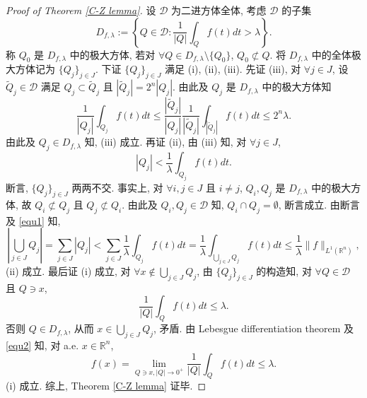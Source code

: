 \documentclass[a4paper,11pt]{article}
\theoremstyle{definition}
\begin{document}
\begin{CJK*}{UTF8}{gbsn}
\begin{proof}[Proof of Theorem \ref{C-Z lemma}]
    设 $ \mathcal{D} $ 为二进方体全体, 考虑 $ \mathcal{D} $ 的子集
    $$
        D_{f, \lambda} := \left\{ Q \in \mathcal{D} : \frac{1}{|Q|} \int_{Q} f(t) dt > \lambda \right\}.
    $$
    称 $ Q_0 $ 是 $ D_{f, \lambda} $ 中的极大方体, 若对 $ \forall Q \in D_{f, \lambda} \setminus \{Q_0\} $, 
    $ Q_0 \not\subset Q $. 将 $ D_{f, \lambda} $ 中的全体极大方体记为 $ \{Q_j\}_{j \in J} $. 
    下证 $ \{Q_j\}_{j \in J} $ 满足 (i), (ii), (iii). 
    先证 (iii),
    对 $ \forall j \in J $, 设 $ \widetilde{Q}_j \in \mathcal{D} $ 满足 $ Q_j \subset \widetilde{Q}_j $
    且 $ |\widetilde{Q}_j| = 2^n |Q_j| $. 由此及 $ Q_j $ 是 $ D_{f, \lambda} $ 中的极大方体知
    $$
        \frac{1}{|Q_j|} \int_{Q_j} f(t) dt 
            \leq \frac{|\widetilde{Q}_j|}{|Q_j|} \frac{1}{|\widetilde{Q}_j|} \int_{|\widetilde{Q}_j|} f(t) dt 
            \leq 2^n \lambda.
    $$
    由此及 $ Q_j \in D_{f, \lambda} $ 知, (iii) 成立. 
    再证 (ii), 
    由 (iii) 知, 对 $ \forall j \in J $, 
    \begin{equation} \label{equ1}
        |Q_j| < \frac{1}{\lambda} \int_{Q_j} f(t) dt.
    \end{equation}
    断言, $ \{Q_j\}_{j \in J} $ 两两不交. 事实上, 对 $ \forall i, j \in J $ 且 $ i \neq j $, 
    $ Q_i, Q_j $ 是 $ D_{f, \lambda} $ 中的极大方体, 故 $ Q_i \not\subset Q_j $ 且 $ Q_j \not\subset Q_i $.
    由此及 $ Q_i, Q_j \in \mathcal{D} $ 知, $ Q_i \cap Q_j = \emptyset $, 断言成立. 
    由断言及 \eqref{equ1} 知,
    $$
         \left| \bigcup_{j \in J} Q_j \right| 
            =  \sum_{j \in J} |Q_j|
            < \sum_{j \in J} \frac{1}{\lambda} \int_{Q_j} f(t) dt
            =\frac{1}{\lambda} \int_{\bigcup_{j \in J} Q_j} f(t) dt
            \leq \frac{1}{\lambda} \| f \|_{L^1(\mathbb{R}^n)},
    $$
    (ii) 成立. 最后证 (i) 成立, 对 $ \forall x \notin \bigcup_{j \in J} Q_j $,
    由 $ \{Q_j\}_{j \in J} $ 的构造知, 对 $ \forall Q \in \mathcal{D} $ 且 $ Q \ni x $, 
    \begin{equation} \label{equ2}
        \frac{1}{|Q|} \int_{Q} f(t) dt \leq \lambda.
    \end{equation}
    否则 $ Q \in D_{f, \lambda}$, 从而 $ x \in \bigcup_{j \in J} Q_j $, 矛盾.
    由 Lebesgue differentiation theorem 及 \eqref{equ2} 知, 对 a.e. $ x \in \mathbb{R}^n $,
    $$
        f(x) = \lim_{Q \ni x, |Q| \to 0^+} \frac{1}{|Q|} \int_{Q} f(t) dt \leq \lambda.
    $$
    (i) 成立. 综上, Theorem \ref{C-Z lemma} 证毕.
\end{proof}


\end{CJK*}
\end{document}
